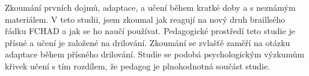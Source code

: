 Zkoumání prvních dojmů, adaptace, a učení během kratké doby a s neznámým materiálem.
V teto studii, jsem zkoumal jak reagují na nový druh braillsého řádku FCHAD a jak se ho naučí používat. Pedagogické prostředí teto studie je přísné a učení je založené na drilování. Zkoumání se zvlašťě zaměří na otázku adaptace během přísného drilování.  Studie se podobá psychologickým výzkumům křivek učení s tím rozdílem, že pedagog je plnohodnotná součást studie.
